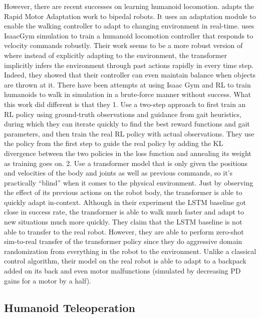 However, there are recent successes on learning humanoid locomotion.
\cite{kumar2022adapting} adapts the Rapid Motor Adaptation work \cite{kumar2021rma} to bipedal robots. It uses an adaptation module to enable the walking controller to adapt to changing environment in real-time. \cite{radosavovic2023learning} uses IsaacGym simulation to train a humanoid locomotion controller that responds to velocity commands robustly. Their work seems to be a more robust version of \cite{kumar2022adapting} where instead of explicitly adapting to the environment, the transformer implicitly infers the environment through past actions rapidly in every time step. Indeed, they showed that their controller can even maintain balance when objects are thrown at it. There have been attempts at using Isaac Gym and RL to train humanoids to walk in simulation in a brute-force manner without success. What this work did different is that they
1. Use a two-step approach to first train an RL policy using ground-truth observations and guidance from gait heuristics, during which they can iterate quickly to find the best reward functions and gait parameters, and then train the real RL policy with actual observations. They use the policy from the first step to guide the real policy by adding the KL divergence between the two policies in the loss function and annealing its weight as training goes on.
2. Use a transformer model that is only given the positions and velocities of the body and joints as well as previous commands, so it’s practically “blind” when it comes to the physical environment. Just by observing the effect of its previous actions on the robot body, the transformer is able to quickly adapt in-context. Although in their experiment the LSTM baseline got close in success rate, the transformer is able to walk much faster and adapt to new situations much more quickly. They claim that the LSTM baseline is not able to transfer to the real robot.
However, they are able to perform zero-shot sim-to-real transfer of the transformer policy since they do aggressive domain randomization from everything in the robot to the environment. Unlike a classical control algorithm, their model on the real robot is able to adapt to a backpack added on its back and even motor malfunctions (simulated by decreasing PD gains for a motor by a half).

\subsection{Humanoid Teleoperation}

